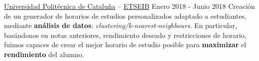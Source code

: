 \documentclass[10pt, a4paper, ragged2e]{altacv}
\begin{document}
\divider

{\href{https://upc.edu}{Universidad Politécnica de Cataluña} --
\href{https://etseib.upc.edu}{ETSEIB}}
{Enero 2018 - Junio 2018}{}
Creación de un generador de horarios de estudios personalizados adaptado a
estudiantes, mediante \textbf{análisis de
  datos}: \textit{clustering/k-nearest-neighbours}. En particular, basándonos en
notas anteriores, rendimiento deseado y restricciones de horario, fuimos capaces
de crear el mejor horario de estudio posible para \textbf{maximizar} el
\textbf{rendimiento} del alumno.


\medskip


\end{document}
